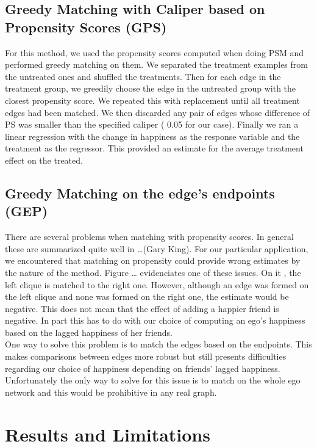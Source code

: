 \documentclass[11pt]{article}
\begin{document}
\subsection{Greedy Matching with Caliper based on Propensity Scores (GPS)}
For this method, we used the propensity scores computed when doing PSM and performed greedy matching on them. We separated the treatment examples from the untreated ones and shuffled the treatments. Then for each edge in the treatment group, we greedily choose the edge in the untreated group with the closest propensity score. We repeated this with replacement until all treatment edges had been matched. We then discarded any pair of edges whose difference of PS was smaller than the specified caliper ( 0.05 for our case). Finally we ran a linear regression with the change in happiness as the response variable and the treatment as the regressor. This provided an estimate for the average treatment effect on the treated.

\subsection{Greedy Matching on the edge's endpoints (GEP)}

There are several problems when matching with propensity scores. In general these are summarized quite well in …(Gary King). For our particular application, we encountered that matching on propensity could provide wrong estimates by the nature of the method. Figure … evidenciates one of these issues. On it , the left clique is matched to the right one. However, although an edge was formed on the left clique and none was formed on the right one, the estimate would be negative. This does not mean that the effect of adding a happier friend is negative. In part this has to do with our choice of computing an ego’s happiness based on the lagged happiness of her friends.\\

One way to solve this problem is to match the edges based on the endpoints. This makes comparisons between edges more robust but still presents difficulties regarding our choice of happiness depending on friends' lagged happiness. Unfortunately the only way to solve for this issue is to match on the whole ego network and this would be prohibitive in any real graph.


\section{Results and Limitations}
\label{Results}
\end{document}
